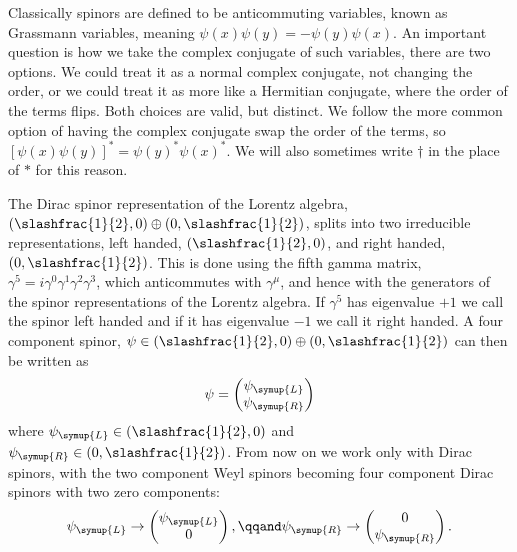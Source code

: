 \documentclass[fleqn]{NotesClass}
\newcommand{\Left}{\symup{L}}
\newcommand{\Right}{\symup{R}}
\begin{document}
    Classically spinors are defined to be anticommuting variables, known as Grassmann variables, meaning \(\psi(x)\psi(y) = -\psi(y)\psi(x)\).
    An important question is how we take the complex conjugate of such variables, there are two options.
    We could treat it as a normal complex conjugate, not changing the order, or we could treat it as more like a Hermitian conjugate, where the order of the terms flips.
    Both choices are valid, but distinct.
    We follow the more common option of having the complex conjugate swap the order of the terms, so \([\psi(x)\psi(y)]^* = \psi(y)^* \psi(x)^*\).
    We will also sometimes write \(\dagger\) in the place of \(*\) for this reason.
    
    The Dirac spinor representation of the Lorentz algebra, \((\slashfrac{1}{2}, 0) \oplus (0, \slashfrac{1}{2})\), splits into two irreducible representations, left handed, \((\slashfrac{1}{2}, 0)\), and right handed, \((0, \slashfrac{1}{2})\).
    This is done using the fifth gamma matrix, \(\gamma^5 = i\gamma^0\gamma^1\gamma^2\gamma^3\), which anticommutes with \(\gamma^\mu\), and hence with the generators of the spinor representations of the Lorentz algebra.
    If \(\gamma^5\) has eigenvalue \(+1\) we call the spinor left handed and if it has eigenvalue \(-1\) we call it right handed.
    A four component spinor, \(\psi \in (\slashfrac{1}{2}, 0) \oplus (0, \slashfrac{1}{2})\) can then be written as
    \begin{equation}
        \psi = 
        \begin{pmatrix}
            \psi_{\Left}\\ \psi_{\Right}
        \end{pmatrix}
    \end{equation}
    where \(\psi_{\Left} \in (\slashfrac{1}{2}, 0)\) and \(\psi_{\Right} \in (0, \slashfrac{1}{2})\).
    From now on we work only with Dirac spinors, with the two component Weyl spinors becoming four component Dirac spinors with two zero components:
    \begin{equation}
        \psi_{\Left} \to 
        \begin{pmatrix}
            \psi_{\Left}\\ 0
        \end{pmatrix}
        , \qqand \psi_{\Right} \to 
        \begin{pmatrix}
            0\\ \psi_{\Right}
        \end{pmatrix}
        .
    \end{equation}
    
\end{document}

